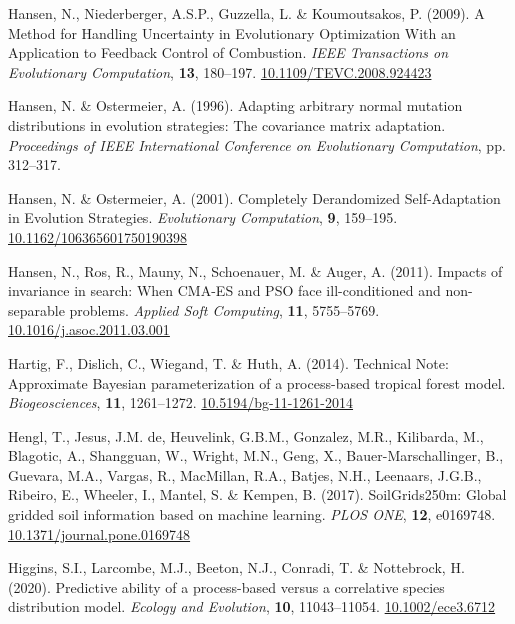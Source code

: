 \documentclass[11pt,]{article}
\newlength{\cslhangindent}
\newenvironment{CSLReferences}[2] %
 {%
  \setlength{\parindent}{0pt}
  \ifodd #1 \everypar{\setlength{\hangindent}{\cslhangindent}}\ignorespaces\fi
  \ifnum #2 > 0
  \setlength{\parskip}{#2\baselineskip}
  \fi
 }%
 {}
\begin{document}
\begin{CSLReferences}{1}{0}
\leavevmode{}%
Hansen, N., Niederberger, A.S.P., Guzzella, L. \& Koumoutsakos, P.
(2009). A {Method} for {Handling} {Uncertainty} in {Evolutionary}
{Optimization} {With} an {Application} to {Feedback} {Control} of
{Combustion}. \emph{IEEE Transactions on Evolutionary Computation},
\textbf{13}, 180--197.
\href{https://doi.org/10.1109/TEVC.2008.924423}{10.1109/TEVC.2008.924423}

\leavevmode{}%
Hansen, N. \& Ostermeier, A. (1996). Adapting arbitrary normal mutation
distributions in evolution strategies: The covariance matrix adaptation.
\emph{Proceedings of {IEEE} {International} {Conference} on
{Evolutionary} {Computation}}, pp. 312--317.

\leavevmode{}%
Hansen, N. \& Ostermeier, A. (2001). Completely {Derandomized}
{Self}-{Adaptation} in {Evolution} {Strategies}. \emph{Evolutionary
Computation}, \textbf{9}, 159--195.
\href{https://doi.org/10.1162/106365601750190398}{10.1162/106365601750190398}

\leavevmode{}%
Hansen, N., Ros, R., Mauny, N., Schoenauer, M. \& Auger, A. (2011).
Impacts of invariance in search: {When} {CMA}-{ES} and {PSO} face
ill-conditioned and non-separable problems. \emph{Applied Soft
Computing}, \textbf{11}, 5755--5769.
\href{https://doi.org/10.1016/j.asoc.2011.03.001}{10.1016/j.asoc.2011.03.001}

\leavevmode{}%
Hartig, F., Dislich, C., Wiegand, T. \& Huth, A. (2014). Technical
{Note}: {Approximate} {Bayesian} parameterization of a process-based
tropical forest model. \emph{Biogeosciences}, \textbf{11}, 1261--1272.
\href{https://doi.org/10.5194/bg-11-1261-2014}{10.5194/bg-11-1261-2014}

\leavevmode{}%
Hengl, T., Jesus, J.M. de, Heuvelink, G.B.M., Gonzalez, M.R., Kilibarda,
M., Blagotic, A., Shangguan, W., Wright, M.N., Geng, X.,
Bauer-Marschallinger, B., Guevara, M.A., Vargas, R., MacMillan, R.A.,
Batjes, N.H., Leenaars, J.G.B., Ribeiro, E., Wheeler, I., Mantel, S. \&
Kempen, B. (2017). {SoilGrids250m}: {Global} gridded soil information
based on machine learning. \emph{PLOS ONE}, \textbf{12}, e0169748.
\href{https://doi.org/10.1371/journal.pone.0169748}{10.1371/journal.pone.0169748}

\leavevmode{}%
Higgins, S.I., Larcombe, M.J., Beeton, N.J., Conradi, T. \& Nottebrock,
H. (2020). Predictive ability of a process-based versus a correlative
species distribution model. \emph{Ecology and Evolution}, \textbf{10},
11043--11054.
\href{https://doi.org/10.1002/ece3.6712}{10.1002/ece3.6712}


\end{CSLReferences}
\end{document}
